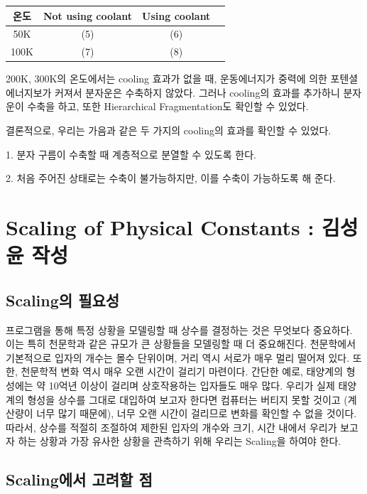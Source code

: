\documentclass{gshs-hutech}
\begin{document}
\begin{table}[h]
	\begin{center}
		\begin{tabular}{|c|c|c|c|}
			\hline
			온도&Not using coolant&Using coolant\\
			\hline
			50K&(5)&(6)\\
			\hline
			100K&(7)&(8)\\
			\hline
		\end{tabular}
	\end{center}
\end{table}

200K, 300K의 온도에서는 cooling 효과가 없을 때, 운동에너지가 중력에 의한 포텐셜 에너지보가 커져서 분자운은 수축하지 않았다. 그러나 cooling의 효과를 추가하니 분자운이 수축을 하고, 또한 Hierarchical Fragmentation도 확인할 수 있었다.

결론적으로, 우리는 가음과 같은 두 가지의 cooling의 효과를 확인할 수 있었다.

1. 분자 구름이 수축할 때 계층적으로 분열할 수 있도록 한다.

2. 처음 주어진 상태로는 수축이 불가능하지만, 이를 수축이 가능하도록 해 준다.

\section{Scaling of Physical Constants : 김성윤 작성} \label{scaling}
\subsection{Scaling의 필요성}

프로그램을 통해 특정 상황을 모델링할 때 상수를 결정하는 것은 무엇보다 중요하다. 이는 특히 천문학과 같은 규모가 큰 상황들을 모델링할 때 더 중요해진다. 천문학에서 기본적으로 입자의 개수는 몰수 단위이며, 거리 역시 서로가 매우 멀리 떨어져 있다. 또한, 천문학적 변화 역시 매우 오랜 시간이 걸리기 마련이다. 간단한 예로, 태양계의 형성에는 약 10억년 이상이 걸리며 상호작용하는 입자들도 매우 많다. 우리가 실제 태양계의 형성을 상수를 그대로 대입하여 보고자 한다면 컴퓨터는 버티지 못할 것이고 (계산량이 너무 많기 때문에), 너무 오랜 시간이 걸리므로 변화를 확인할 수 없을 것이다. 따라서, 상수를 적절히 조절하여 제한된 입자의 개수와 크기, 시간 내에서 우리가 보고자 하는 상황과 가장 유사한 상황을 관측하기 위해 우리는 Scaling을 하여야 한다. 

\subsection{Scaling에서 고려할 점}
\end{document}
